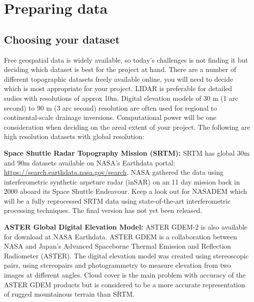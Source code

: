 \chapter{Preparing data} \label{prep}

\section{Choosing your dataset}

Free geospatial data is widely available, so today's challenges is not finding it but deciding which dataset is best for the project at hand. There are a number of different topographic datasets freely available online, you will need to decide which is most appropriate for your project. LIDAR is preferable for detailed sudies with resolutions of approx 10m. Digital elevation models of 30 m (1 arc second) to 90 m (3 arc second) resolution are often used for regional to continental-scale drainage inversions. Computational power will be one consideration when deciding on the areal extent of your project. The following are high resolution datasets with global resolution:

\vspace{3mm}

\noindent	\textbf{Space Shuttle Radar Topography Mission (SRTM):} SRTM has global 30m and 90m datasets available on NASA's Earthdata portal:
\url{https://search.earthdata.nasa.gov/search}. 
NASA gathered the data using interferometric synthetic arpeture radar (inSAR) on an 11 day mission back in 2000 aboard its Space Shuttle Endeavour. Keep a look out for NASADEM which will be a fully reprocessed SRTM data using state-of-the-art interferometric processing techniques. The final version has not yet been released. 

\vspace{3mm}

\noindent \textbf{ASTER Global Digital Elevation Model:} ASTER GDEM-2 is also available for download at NASA Earthdata. ASTER GDEM is a collaboration between NASA and Japan's Advanced Spaceborne Thermal Emission and Reflection Radiometer (ASTER). The digital elevation model was created using stereoscopic pairs, using stereopairs and photogrammetry to measure elevation from two images at different angles. Cloud cover is the main problem with accuracy of the ASTER GDEM products but is considered to be a more accurate representation of rugged mountainous terrain than SRTM. 

\vspace{3mm}

